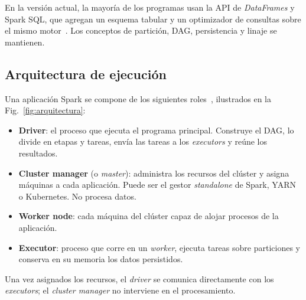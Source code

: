 \documentclass[conference,a4paper]{IEEEtran}
\begin{document}
En la versión actual, la mayoría de los programas usan la API de \textit{DataFrames} y Spark SQL, que agregan un esquema tabular y un optimizador de consultas sobre el mismo motor~\cite{zaharia2016unified}. Los conceptos de partición, DAG, persistencia y linaje se mantienen.

\subsection{Arquitectura de ejecución}

Una aplicación Spark se compone de los siguientes roles~\cite{spark-cluster}, ilustrados en la Fig.~\ref{fig:arquitectura}:

\begin{itemize}
\item \textbf{Driver}: el proceso que ejecuta el programa principal. Construye el DAG, lo divide en etapas y tareas, envía las tareas a los \textit{executors} y reúne los resultados.
\item \textbf{Cluster manager} (o \textit{master}): administra los recursos del clúster y asigna máquinas a cada aplicación. Puede ser el gestor \textit{standalone} de Spark, YARN~\cite{vavilapalli2013yarn} o Kubernetes. No procesa datos.
\item \textbf{Worker node}: cada máquina del clúster capaz de alojar procesos de la aplicación.
\item \textbf{Executor}: proceso que corre en un \textit{worker}, ejecuta tareas sobre particiones y conserva en su memoria los datos persistidos.
\end{itemize}

Una vez asignados los recursos, el \textit{driver} se comunica directamente con los \textit{executors}; el \textit{cluster manager} no interviene en el procesamiento.
\end{document}
